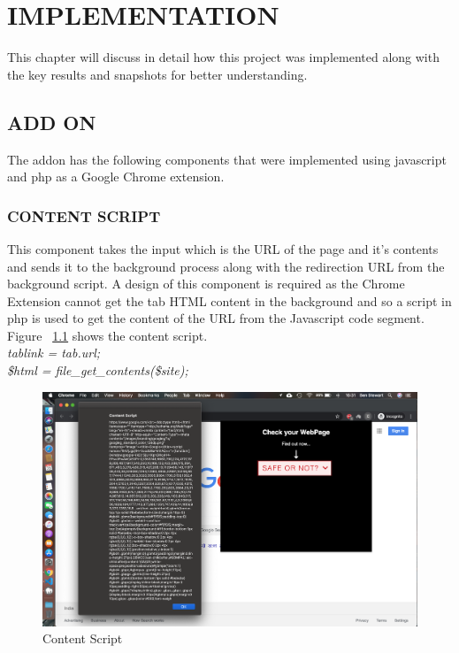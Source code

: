 
\chapter{IMPLEMENTATION} %
This chapter will discuss in detail how this project was implemented along with the key results and snapshots for better understanding.

\section{ADD ON}
The addon has the following components that were implemented using javascript and php as a Google Chrome extension.

\subsection{CONTENT SCRIPT}
This component takes the input which is the URL of the page and it’s contents and sends it to the background process along with the redirection URL from the background script. A design of this component is required as the Chrome Extension cannot get the tab HTML content in the background and so a script in php is used to get the content of the URL from the Javascript code segment. Figure ~\ref{fig:contentscript} shows the content script.\\
\null\quad\textit{tablink = tab.url;}\\
\null\quad\textit{\$html = file\_get\_contents(\$site);}\\

\begin{figure}[htp]
\centering
\includegraphics[scale=0.15]{Figures/image9.png}
\caption{Content Script}
\label{fig:contentscript}
\end{figure}

